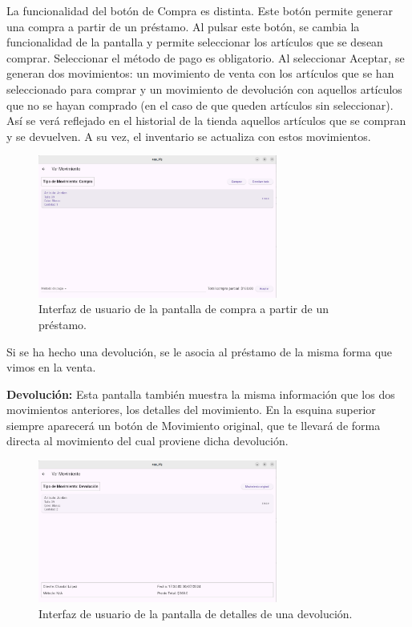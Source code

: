 La funcionalidad del botón de Compra es distinta. Este botón permite generar una compra a partir de un préstamo. Al pulsar este botón, se cambia la funcionalidad de la pantalla y permite seleccionar los artículos que se desean comprar. Seleccionar el método de pago es obligatorio. Al seleccionar Aceptar, se generan dos movimientos: un movimiento de venta con los artículos que se han seleccionado para comprar y un movimiento de devolución con aquellos artículos que no se hayan comprado (en el caso de que queden artículos sin seleccionar). Así se verá reflejado en el historial de la tienda aquellos artículos que se compran y se devuelven. A su vez, el inventario se actualiza con estos movimientos. 

\begin{figure}[H]
	\centering
	\includegraphics[width=0.7\textwidth]{imagenes/SegundaIteracion/compraPrestamo.png}
	\caption{Interfaz de usuario de la pantalla de compra a partir de un préstamo.}
	\label{fig:appPantallaCompraPrestamo}
\end{figure}

Si se ha hecho una devolución, se le asocia al préstamo de la misma forma que vimos en la venta.

\newpage

\textbf{Devolución: } Esta pantalla también muestra la misma información que los dos movimientos anteriores, los detalles del movimiento. En la esquina superior siempre aparecerá un botón de Movimiento original, que te llevará de forma directa al movimiento del cual proviene dicha devolución. 

\begin{figure}[H]
	\centering
	\includegraphics[width=0.7\textwidth]{imagenes/SegundaIteracion/detallesDevolucion.png}
	\caption{Interfaz de usuario de la pantalla de detalles de una devolución.}
	\label{fig:appPantallaDetallesDevolucion}
\end{figure}

